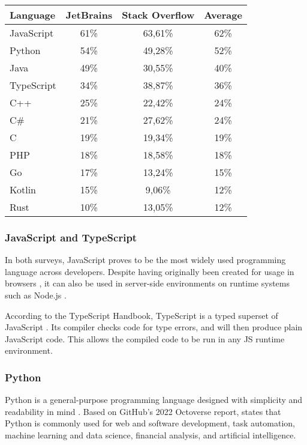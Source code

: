 \begin{center}
    
\begin{tabular}{| l| c c c |}
\hline
Language   & JetBrains & Stack Overflow & Average \\
\hline
JavaScript & 61\%      & 63,61\%        & 62\%    \\
Python     & 54\%      & 49,28\%        & 52\%    \\
Java       & 49\%      & 30,55\%        & 40\%    \\
TypeScript & 34\%      & 38,87\%        & 36\%    \\
C++        & 25\%      & 22,42\%        & 24\%    \\
C\#        & 21\%      & 27,62\%        & 24\%    \\
C          & 19\%      & 19,34\%        & 19\%    \\
PHP        & 18\%      & 18,58\%        & 18\%    \\
Go         & 17\%      & 13,24\%        & 15\%    \\
Kotlin     & 15\%      & 9,06\%         & 12\%    \\
Rust       & 10\%      & 13,05\%        & 12\%    \\
\hline
\end{tabular}
\end{center}


\subsubsection{JavaScript and TypeScript}
In both surveys, JavaScript proves to be the most widely used programming language across developers. Despite having originally been created for usage in browsers \autocite{NCC1995}, it can also be used in server-side environments on runtime systems such as Node.js \autocite{OpenJSFoundation}.

According to the TypeScript Handbook, TypeScript is a typed superset of JavaScript \autocite{TypeScript2023}. Its compiler checks code for type errors, and will then produce plain JavaScript code. This allows the compiled code to be run in any JS runtime environment.

\subsubsection{Python}
Python is a general-purpose programming language designed with simplicity and readability in mind \autocite{Peters2004}. Based on GitHub's 2022 Octoverse report, \textcite{Scarlett2023} states that Python is commonly used for web and software development, task automation, machine learning and data science, financial analysis, and artificial intelligence.

